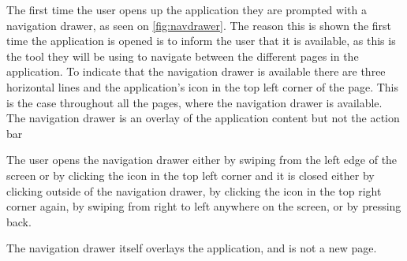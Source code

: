 The first time the user opens up the application they are prompted with a navigation drawer, as seen on \autoref{fig:navdrawer}. The reason this is shown the first time the application is opened is to inform the user that it is available, as this is the tool they will be using to navigate between the different pages in the application. To indicate that the navigation drawer is available there are three horizontal lines and the application's icon in the top left corner of the page. This is the case throughout all the pages, where the navigation drawer is available. The navigation drawer is an overlay of the application content but not the action bar

The user opens the navigation drawer either by swiping from the left edge of the screen or by clicking the icon in the top left corner and it is closed either by clicking outside of the navigation drawer, by clicking the icon in the top right corner again, by swiping from right to left anywhere on the screen, or by pressing back.

The navigation drawer itself overlays the application, and is not a new page.
